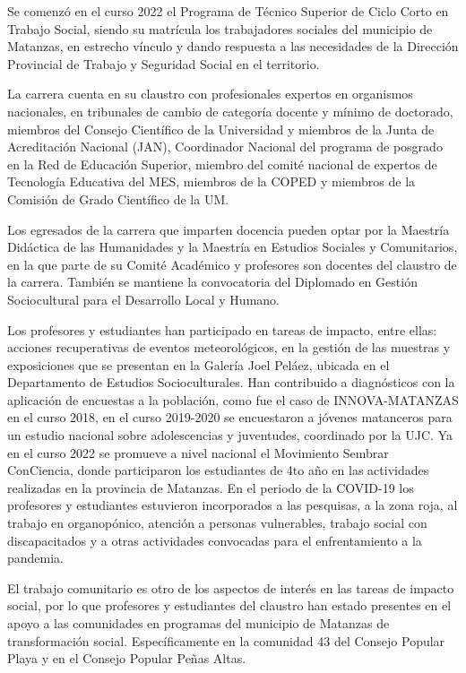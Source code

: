 Se comenzó en el curso 2022 el Programa de Técnico Superior de Ciclo Corto en Trabajo Social, siendo su matrícula los trabajadores sociales del municipio de Matanzas, en estrecho vínculo y dando respuesta a las necesidades de la Dirección Provincial de Trabajo y Seguridad Social en el territorio. 
 
La carrera cuenta en su claustro con profesionales expertos en organismos nacionales, en tribunales de cambio de categoría docente y mínimo de doctorado, miembros del Consejo Científico de la Universidad y miembros de la Junta de Acreditación Nacional (JAN), Coordinador Nacional del programa de posgrado en la Red de Educación Superior, miembro del comité nacional de expertos de Tecnología Educativa del MES, miembros de la COPED y miembros de la Comisión de Grado Científico de la UM.
 
Los egresados de la carrera que imparten docencia pueden optar por la Maestría Didáctica de las Humanidades y la Maestría en Estudios Sociales y Comunitarios, en la que parte de su Comité Académico y profesores son docentes del claustro de la carrera. También se mantiene la convocatoria del Diplomado en Gestión Sociocultural para el Desarrollo Local y Humano.

Los profesores y estudiantes han participado en tareas de impacto, entre ellas: 
acciones recuperativas de eventos meteorológicos, en la gestión de las muestras y exposiciones que se presentan en la Galería Joel Peláez, ubicada en el Departamento de Estudios Socioculturales. Han contribuido a diagnósticos con la aplicación de encuestas a la población, como fue el caso de INNOVA-MATANZAS en el curso 2018, en el curso 2019-2020 se encuestaron a jóvenes matanceros para un estudio nacional sobre adolescencias y juventudes, coordinado por la UJC. Ya en el curso 2022 se promueve a nivel nacional el Movimiento Sembrar ConCiencia, donde participaron los estudiantes de 4to año en las actividades realizadas en la provincia de Matanzas. 
En el periodo de la COVID-19 los profesores y estudiantes estuvieron incorporados a las pesquisas, a la zona roja, al trabajo en organopónico, atención a personas vulnerables, trabajo social con discapacitados y a otras actividades convocadas para el enfrentamiento a la pandemia.

El trabajo comunitario es otro de los aspectos de interés en las tareas de impacto social, por lo que profesores y estudiantes del claustro han estado presentes en el apoyo a las comunidades en programas del municipio de Matanzas de transformación social. Específicamente en la comunidad 43 del Consejo Popular Playa y en el Consejo Popular Peñas Altas. 

